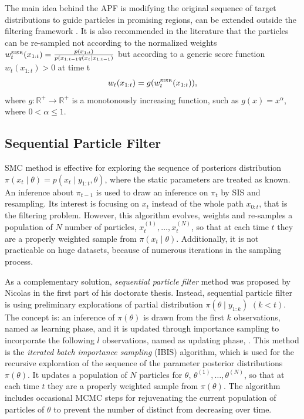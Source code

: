 The main idea behind the APF is modifying the original sequence of target distributions to guide particles in promising regions, can be extended outside the filtering framework \cite{JOHANSEN20081498}. It is also recommended in the literature \cite{liu2008monte} that the particles can be re-sampled not according to the normalized weights $w_t^{\mbox{\tiny SISR}}(x_{1:t})=\frac{p(x_{1:t})}{ p(x_{1:t-1}q(x_t\mid x_{1:t-1})  }$  but according to a generic score function $w_t(x_{1:t})>0$ at time t
\begin{equation*}
w_t(x_{1:t}) = g(w_t^{\mbox{\tiny SISR}}(x_{1:t})),
\end{equation*}
where $g: \mathbb{R}^+\rightarrow \mathbb{R}^+$ is a monotonously increasing function, such as $g(x)=x^\alpha$, where $0<\alpha\leq 1$. 



\subsection{Sequential Particle Filter}


SMC method is effective for exploring the sequence of posteriors distribution  $\pi(x_t\mid\theta) = p(x_t\mid y_{1:t},\theta)$, where the static parameters are
treated as known. An inference about $\pi_{t-1}$ is used to draw an inference on $\pi_t$ by SIS and resampling. Its interest is focusing on $x_t$ instead of the whole path $x_{0:t}$, that is the filtering problem. However, this algorithm evolves, weights and re-samples a population of $N$ number of particles, $x_t^{(1)},\ldots,x_t^{(N)}$, so that at each time $t$ they are a properly weighted sample from $\pi(x_t \mid \theta)$. Additionally, it is not practicable on huge datasets, because of numerous iterations in the sampling process. 

As a complementary solution, \textit{sequential particle filter} method was proposed by Nicolas \cite{chopin2002sequential} in the first part of his doctorate thesis. Instead, sequential particle filter is using preliminary explorations of partial distribution $\pi(\theta\mid y_{1:k})$ $(k<t)$. The concept is: an inference of $\pi(\theta)$ is drawn from the first $k$ observations, named as learning phase, and it is updated through importance sampling to incorporate the following $l$ observations, named as updating phase, \cite{chopin2002sequential}.  This method is the \textit{iterated batch importance sampling} (IBIS) algorithm, which is used for the recursive exploration of the sequence of the parameter posterior distributions $\pi(\theta)$. It updates a population of $N$ particles for $\theta$, $\theta^{(1)}, \ldots, \theta^{(N)}$, so that at each time $t$ they are a properly weighted sample from $\pi(\theta)$. The algorithm includes occasional MCMC steps for rejuvenating the current population of particles of $\theta$  to prevent the number of distinct from decreasing over time. 

